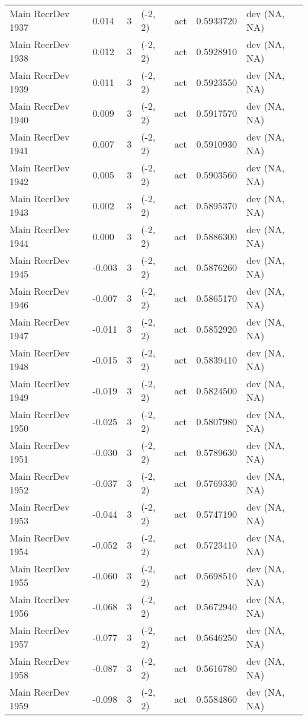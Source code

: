 \documentclass[11pt,
  english,
  a4paper,
]{article}
\begin{document}
\begin{landscape}
\begin{longtable}[t]{>{\raggedright\arraybackslash}p{6cm}lllll>{\raggedright\arraybackslash}p{4cm}}
Main RecrDev 1937 & 0.014 & 3 & (-2, 2) & act & 0.5933720 & dev (NA, NA)\\
Main RecrDev 1938 & 0.012 & 3 & (-2, 2) & act & 0.5928910 & dev (NA, NA)\\
Main RecrDev 1939 & 0.011 & 3 & (-2, 2) & act & 0.5923550 & dev (NA, NA)\\
Main RecrDev 1940 & 0.009 & 3 & (-2, 2) & act & 0.5917570 & dev (NA, NA)\\
Main RecrDev 1941 & 0.007 & 3 & (-2, 2) & act & 0.5910930 & dev (NA, NA)\\
Main RecrDev 1942 & 0.005 & 3 & (-2, 2) & act & 0.5903560 & dev (NA, NA)\\
Main RecrDev 1943 & 0.002 & 3 & (-2, 2) & act & 0.5895370 & dev (NA, NA)\\
Main RecrDev 1944 & 0.000 & 3 & (-2, 2) & act & 0.5886300 & dev (NA, NA)\\
Main RecrDev 1945 & -0.003 & 3 & (-2, 2) & act & 0.5876260 & dev (NA, NA)\\
Main RecrDev 1946 & -0.007 & 3 & (-2, 2) & act & 0.5865170 & dev (NA, NA)\\
Main RecrDev 1947 & -0.011 & 3 & (-2, 2) & act & 0.5852920 & dev (NA, NA)\\
Main RecrDev 1948 & -0.015 & 3 & (-2, 2) & act & 0.5839410 & dev (NA, NA)\\
Main RecrDev 1949 & -0.019 & 3 & (-2, 2) & act & 0.5824500 & dev (NA, NA)\\
Main RecrDev 1950 & -0.025 & 3 & (-2, 2) & act & 0.5807980 & dev (NA, NA)\\
Main RecrDev 1951 & -0.030 & 3 & (-2, 2) & act & 0.5789630 & dev (NA, NA)\\
Main RecrDev 1952 & -0.037 & 3 & (-2, 2) & act & 0.5769330 & dev (NA, NA)\\
Main RecrDev 1953 & -0.044 & 3 & (-2, 2) & act & 0.5747190 & dev (NA, NA)\\
Main RecrDev 1954 & -0.052 & 3 & (-2, 2) & act & 0.5723410 & dev (NA, NA)\\
Main RecrDev 1955 & -0.060 & 3 & (-2, 2) & act & 0.5698510 & dev (NA, NA)\\
Main RecrDev 1956 & -0.068 & 3 & (-2, 2) & act & 0.5672940 & dev (NA, NA)\\
Main RecrDev 1957 & -0.077 & 3 & (-2, 2) & act & 0.5646250 & dev (NA, NA)\\
Main RecrDev 1958 & -0.087 & 3 & (-2, 2) & act & 0.5616780 & dev (NA, NA)\\
Main RecrDev 1959 & -0.098 & 3 & (-2, 2) & act & 0.5584860 & dev (NA, NA)\\

\end{longtable}
\end{landscape}
\end{document}
